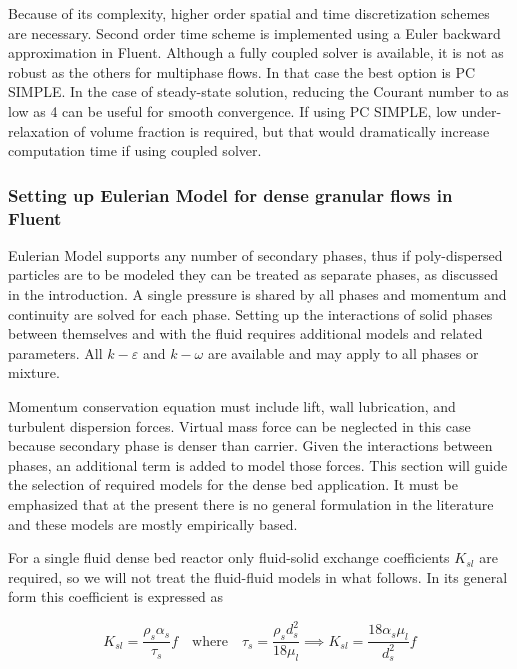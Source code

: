 Because of its complexity, higher order spatial and time discretization schemes are necessary. Second order time scheme is implemented using a Euler backward approximation in Fluent. Although a fully coupled solver is available, it is not as robust as the others for multiphase flows. In that case the best option is PC SIMPLE. In the case of steady-state solution, reducing the Courant number to as low as 4 can be useful for smooth convergence. If using PC SIMPLE, low under-relaxation of volume fraction is required, but that would dramatically increase computation time if using coupled solver.

\subsubsection{Setting up Eulerian Model for dense granular flows in Fluent}

Eulerian Model supports any number of secondary phases, thus if poly-dispersed particles are to be modeled they can be treated as separate phases, as discussed in the introduction. A single pressure is shared by all phases and momentum and continuity are solved for each phase. Setting up the interactions of solid phases between themselves and with the fluid requires additional models and related parameters. All $k-\varepsilon$ and $k-\omega$ are available and may apply to all phases or mixture.

Momentum conservation equation must include lift, wall lubrication, and turbulent dispersion forces. Virtual mass force can be neglected in this case because secondary phase is denser than carrier. Given the interactions between phases, an additional term is added to model those forces. This section will guide the selection of required models for the dense bed application. It must be emphasized that at the present there is no general formulation in the literature and these models are mostly empirically based.

For a single fluid dense bed reactor only fluid-solid exchange coefficients $K_{sl}$ are required, so we will not treat the fluid-fluid models in what follows. In its general form this coefficient is expressed as

\begin{equation}
K_{sl}=\frac{\rho_{s}\alpha_{s}}{\tau_{s}}f\quad\text{where}\quad\tau_{s}=\frac{\rho_{s}d_{s}^{2}}{18\mu_{l}}\implies{}K_{sl}=\frac{18\alpha_{s}\mu_{l}}{d_{s}^{2}}f
\end{equation}

